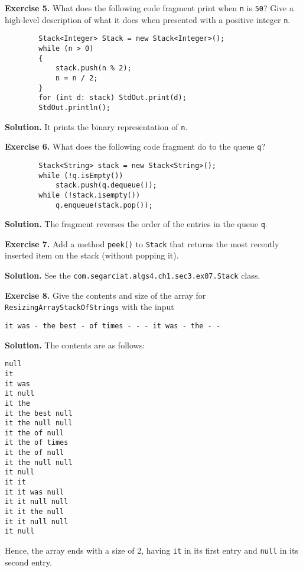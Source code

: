 \documentclass[12pt, a4paper]{article}
\newenvironment{ex}[2][Exercise]
{\par\medskip\noindent \textbf{#1 #2.}}
{\medskip}
\newenvironment{sol}[1][Solution]
{\par\medskip\noindent \textbf{#1.} }
{\medskip}
\begin{document}
	\begin{ex}{5}
		What does the following code fragment print when \texttt{n} is \texttt{50}?
		Give a high-level description of what it does when presented with a positive
		integer \texttt{n}.
		
		\begin{lstlisting}
		Stack<Integer> Stack = new Stack<Integer>();
		while (n > 0)
		{
			stack.push(n % 2);
			n = n / 2;
		}
		for (int d: stack) StdOut.print(d);
		StdOut.println();
		\end{lstlisting}
	\end{ex}
	\begin{sol}
		It prints the binary representation of \texttt{n}.
	\end{sol}

	\begin{ex}{6}
		What does the following code fragment do to the queue \texttt{q}?
		\begin{lstlisting}
		Stack<String> stack = new Stack<String>();
		while (!q.isEmpty())
			stack.push(q.dequeue());
		while (!stack.isempty())
			q.enqueue(stack.pop());
		\end{lstlisting}
	\end{ex}
	\begin{sol}
		The fragment reverses the order of the entries in the queue \texttt{q}.
	\end{sol}
	\begin{ex}{7}
		Add a method \texttt{peek()} to \texttt{Stack} that returns the most recently inserted
		item on the stack (without popping it).
	\end{ex}
	\begin{sol}
		See the \texttt{com.segarciat.algs4.ch1.sec3.ex07.Stack} class.
	\end{sol}
	\begin{ex}{8}
		Give the contents and size of the array for \texttt{ResizingArrayStackOfStrings}
		with the input
		\begin{lstlisting}[language={}]
		it was - the best - of times - - - it was - the - -
		\end{lstlisting}
	\end{ex}
	\begin{sol}
		The contents are as follows:
		\begin{lstlisting}[language={}]
null
it
it was
it null
it the
it the best null
it the null null
it the of null
it the of times
it the of null
it the null null
it null
it it
it it was null
it it null null
it it the null
it it null null
it null
		\end{lstlisting}
		Hence, the array ends with a size of 2, having \texttt{it} in its first entry
		and \texttt{null} in its second entry.
	\end{sol}
\end{document}
